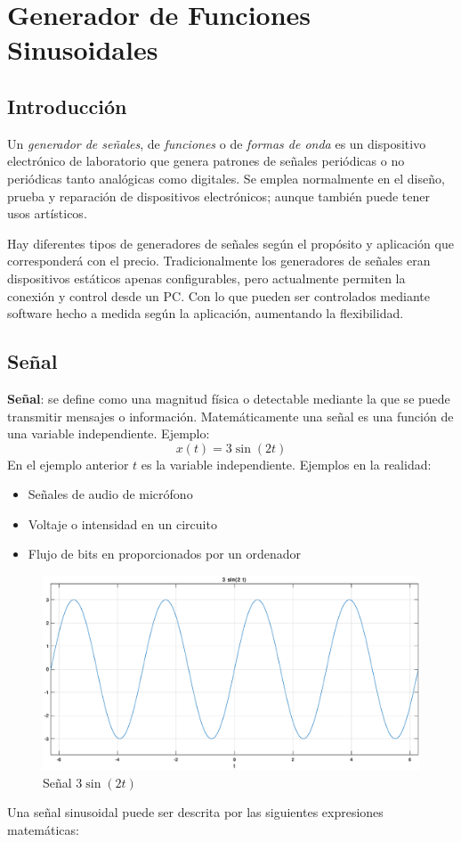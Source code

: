 \documentclass[11pt]{article}
\begin{document}
\section{Generador de Funciones Sinusoidales}
\subsection{Introducción}

Un \emph{generador de señales}, de \emph{funciones} o de
\emph{formas de onda} es un dispositivo electrónico de
laboratorio que genera patrones de señales periódicas o no
periódicas tanto analógicas como digitales. Se emplea
normalmente en el diseño, prueba y reparación de dispositivos
electrónicos; aunque también puede tener usos artísticos.

Hay diferentes tipos de generadores de señales según el
propósito y aplicación que corresponderá con el precio.
Tradicionalmente los generadores de señales eran dispositivos
estáticos apenas configurables, pero actualmente permiten la
conexión y control desde un PC. Con lo que pueden ser
controlados mediante software hecho a medida según la
aplicación, aumentando la flexibilidad. \citep{gdf}

\subsection{Señal}
\textbf{Señal}: se define como una magnitud física o detectable
mediante la que se puede transmitir mensajes o información.
Matemáticamente una señal es una función de una variable
independiente. Ejemplo:
$$x(t) = 3\sin(2t)$$
En el ejemplo anterior $t$ es la variable independiente.
Ejemplos en la realidad:
\begin{itemize}
\item Señales de audio de micrófono
\item Voltaje o intensidad en un circuito
\item Flujo de bits en proporcionados por un ordenador \citep{iss}
\end{itemize}

\begin{figure}[h]
\centering
\includegraphics[scale=0.3]{pics/3sin2t.eps} 
\caption{Señal $3\sin(2t)$}
\end{figure}
\newpage
Una señal sinusoidal puede ser descrita por las siguientes
expresiones matemáticas:
\end{document}
